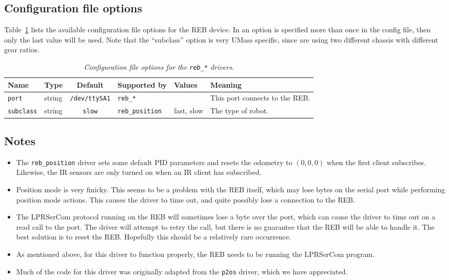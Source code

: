 \subsection*{Configuration file options}
Table~\ref{table:reb_options} lists the available configuration file options for the REB device.  In an
option is specified more than once in the config file, then only the last value will be used.  Note that the
``subclass'' option is very UMass specific, since are using two different chassis with different gear ratios.

\begin{table}[ht]
\begin{center}
{\small \begin{tabular}{|l|l|c|l|l|l|} \hline
Name & Type & Default & Supported by &  Values & Meaning \\ \hline
{\tt port} & string & {\tt /dev/ttySA1} & {\tt reb\_*} &  & This port connects to the REB.\\ \hline
{\tt subclass} & string & {\tt slow} & {\tt reb\_position} & fast, slow & The type of robot.\\ \hline
\end{tabular}}
\end{center}
\caption{{\em Configuration file options for the {\tt reb\_*} drivers}.}
\label{table:reb_options}
\end{table}

\subsection*{Notes}
\begin{itemize} 
\item The {\tt reb\_position} driver sets some default PID parameters and resets the odometry to $(0,0,0)$ when
the first client subscribes.  Likewise, the IR sensors are only turned on when an IR client has subscribed.
\item Position mode is very finicky.  This seems to be a problem with the REB itself, which may lose bytes
on the serial port while performing position mode actions.  This causes the driver to time out, and quite possibly
lose a connection to the REB.
\item The LPRSerCom protocol running on the REB will sometimes lose a byte over the port, which can cause
the driver to time out on a read call to the port.  The driver will attempt to retry the call, but there is no
guarantee that the REB will be able to handle it.  The best solution is to reset the REB.  Hopefully this
should be a relatively rare occurrence.
\item As mentioned above, for this driver to function properly, the REB needs to be running the LPRSerCom program.
\item Much of the code for this driver was originally adapted from the {\tt p2os} driver, which we have appreciated.
\end{itemize}
